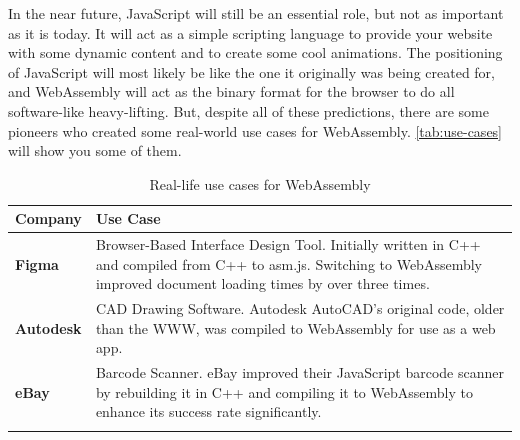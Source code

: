 \documentclass[10pt]{article}  %
\begin{document}
\begin{sloppypar}
  In the near future, JavaScript will still be an essential role, but not as important as it is today. It will act as a simple scripting language to provide your website with some dynamic content and to create some cool animations. The positioning of JavaScript will most likely be like the one it originally was being created for, and WebAssembly will act as the binary format for the browser to do all software-like heavy-lifting. But, despite all of these predictions, there are some pioneers who created some real-world use cases for WebAssembly. \autoref{tab:use-cases} will show you some of them.


  \begin{table}[ht]
    \centering
    \renewcommand{\arraystretch}{1.5} %
    \renewcommand{\tabcolsep}{7pt} %
    \begin{tabularx}{\textwidth}{lX}
      \Xhline{2.75\arrayrulewidth} %
      \textbf{Company}  & \textbf{Use Case}                                                                                                                                                            \\
      \midrule
      \textbf{Figma}    & Browser-Based Interface Design Tool. Initially written in C++ and compiled from C++ to asm.js. Switching to WebAssembly improved document loading times by over three times. \\
      \arrayrulecolor{lightgray} %
      \midrule
      \textbf{Autodesk} & CAD Drawing Software. Autodesk AutoCAD's original code, older than the WWW, was compiled to WebAssembly for use as a web app.                                                \\
      \midrule
      \textbf{eBay}     & Barcode Scanner. eBay improved their JavaScript barcode scanner by rebuilding it in C++ and compiling it to WebAssembly to enhance its success rate significantly.           \\
      \arrayrulecolor{black} %
      \Xhline{2.75\arrayrulewidth} %
    \end{tabularx}
    \caption{Real-life use cases for WebAssembly}
    \label{tab:use-cases}
  \end{table}

  \pagebreak
  
  

\end{sloppypar}
\end{document}
